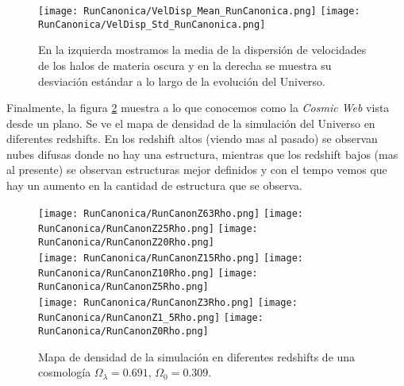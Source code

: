 \begin{figure}[H]
    \centering
    \texttt{[image: RunCanonica/VelDisp\_Mean\_RunCanonica.png]}
    \texttt{[image: RunCanonica/VelDisp\_Std\_RunCanonica.png]}
    \caption[Media y desviación estándar de la dispersión de velocidades de un Universo $\Omega_\lambda = 0.691 $, $\Omega_0 = 0.309$]{\footnotesize En la izquierda mostramos la media de la dispersión de velocidades de los halos de materia oscura y en la derecha se muestra su desviación estándar a lo largo de la evolución del Universo.}
    \label{fig:Canon-VelDispStats}
\end{figure}

Finalmente, la figura \ref{fig:CanonRunDensityMap} muestra a lo que conocemos como la \emph{Cosmic Web} vista desde un plano. Se ve el mapa de densidad de la simulación del Universo en diferentes redshifts. En los redshift altos (viendo mas al pasado) se observan nubes difusas donde no hay una estructura, mientras que los redshift bajos (mas al presente) se observan estructuras mejor definidos y con el tempo vemos que hay un aumento en la cantidad de estructura que se observa.

\begin{figure}[H]
    \centering

    \texttt{[image: RunCanonica/RunCanonZ63Rho.png]}   %
    \texttt{[image: RunCanonica/RunCanonZ25Rho.png]}   %
    \texttt{[image: RunCanonica/RunCanonZ20Rho.png]}   %
    \\
    \texttt{[image: RunCanonica/RunCanonZ15Rho.png]}   %
    \texttt{[image: RunCanonica/RunCanonZ10Rho.png]}   %
    \texttt{[image: RunCanonica/RunCanonZ5Rho.png]}    %
    \\
    \texttt{[image: RunCanonica/RunCanonZ3Rho.png]}    %
    \texttt{[image: RunCanonica/RunCanonZ1\_5Rho.png]}  %
    \texttt{[image: RunCanonica/RunCanonZ0Rho.png]}    %
    \caption[Mapa de densidad de un Universo $\Omega_\lambda = 0.691 $, $\Omega_0 = 0.309$ en en diferentes redshift]{ \footnotesize Mapa de densidad de la simulación en diferentes redshifts de una cosmología $\Omega_\lambda = 0.691 $, $\Omega_0 = 0.309$. }
    \label{fig:CanonRunDensityMap}
\end{figure}

